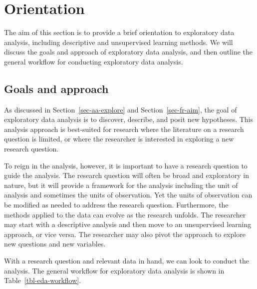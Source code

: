 \documentclass[
  letterpaper,
  DIV=11,
  numbers=noendperiod]{scrreprt}
\theoremstyle{definition}
\theoremstyle{remark}
\begin{document}
\section{Orientation}\label{sec-eda-orientation}

The aim of this section is to provide a brief orientation to exploratory
data analysis, including descriptive and unsupervised learning methods.
We will discuss the goals and approach of exploratory data analysis, and
then outline the general workflow for conducting exploratory data
analysis.

\subsection{Goals and approach}\label{sec-eda-goals-approach}

As discussed in Section~\ref{sec-aa-explore} and
Section~\ref{sec-fr-aim}, the goal of exploratory data analysis is to
discover, describe, and posit new hypotheses. This analysis approach is
best-suited for research where the literature on a research question is
limited, or where the researcher is interested in exploring a new
research question.

To reign in the analysis, however, it is important to have a research
question to guide the analysis. The research question will often be
broad and exploratory in nature, but it will provide a framework for the
analysis including the unit of analysis and sometimes the units of
observation. Yet the units of observation can be modified as needed to
address the research question. Furthermore, the methods applied to the
data can evolve as the research unfolds. The researcher may start with a
descriptive analysis and then move to an unsupervised learning approach,
or vice versa. The researcher may also pivot the approach to explore new
questions and new variables.

With a research question and relevant data in hand, we can look to
conduct the analysis. The general workflow for exploratory data analysis
is shown in Table~\ref{tbl-eda-workflow}.
\end{document}
